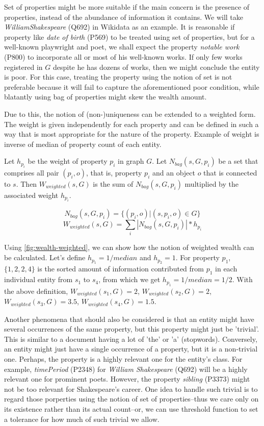Set of properties might be more suitable if the main concern is the presence of properties, instead of the abundance of information it contains. We will take \textit{WilliamShakespeare} (Q692) in Wikidata as an example. It is reasonable if property like  \textit{date of birth} (P569) to be treated using set of properties, but for a well-known playwright and poet, we shall expect the property \textit{notable work} (P800) to incorporate all or most of his well-known works. If only few works registered in \(G\) despite he has dozens of works, then we might conclude the entity is poor. For this case, treating the property using the notion of set is not preferable because it will fail to capture the aforementioned poor condition, while blatantly using bag of properties might skew the wealth amount.

Due to this, the notion of (non-)uniqueness can be extended to a weighted form. The weight is given independently for each property and can be defined in such a way that is most appropriate for the nature of the property. Example of weight is inverse of median of property count of each entity.

Let \(h_{p_i}\) be the weight of property \(p_i\) in graph \(G\). Let \(N_{bag}(s,G,p_i)\) be a set that comprises all pair  \((p_i,o)\), that is, property \(p_i\) and an object \(o\) that is connected to \(s\). Then \(W_{weighted}(s, G)\) is the sum of \(N_{bag}(s,G,p_i)\) multiplied by the associated weight \(h_{p_i}\).


\[
    N_{bag}(s,G,p_i) = \{(p_i, o) | (s, p_i, o) \in G\}
\]
\[
    W_{weighted}(s, G) = \sum_i |N_{bag}(s,G,p_i)| * h_{p_i}
\]

Using \autoref{fig:wealth-weighted}, we can show how the notion of weighted wealth can be calculated. Let's define \(h_{p_1} = 1/median\) and \(h_{p_2} = 1\). For property \(p_1\), \(\{1, 2, 2, 4\}\) is the sorted amount of information contributed from \(p_1\) in each individual entity from \(s_1\) to \(s_4\), from which we get \(h_{p_1} = 1/median = 1/2\). With the above definition, \(W_{weighted}(s_1, G) = 2\), \(W_{weighted}(s_2, G) = 2\), \(W_{weighted}(s_3, G) = 3.5\), \(W_{weighted}(s_4, G) = 1.5\).

Another phenomena that should also be considered is that an entity might have several occurrences of the same property, but this property might just be 'trivial'. This is similar to a document having a lot of 'the' or 'a' (stopwords). Conversely, an entity might just have a single occurrence of a property, but it is a non-trivial one. Perhaps, the property is a highly relevant one for the entity's class. For example, \textit{timePeriod} (P2348) for \textit{William Shakespeare} (Q692) will be a highly relevant one for prominent poets. However, the property \textit{sibling} (P3373) might not be too relevant for Shakespeare's career. One idea to handle such trivial is to regard those porperties using the notion of set of properties--thus we care only on its existence rather than its actual count--or, we can use threshold function to set a tolerance for how much of such trivial we allow.

